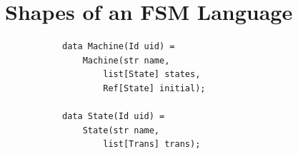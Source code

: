 \section{Shapes of an FSM Language}


\begin{figure}[bt]
	\centering
	\begin{subfigure}[b]{.3\columnwidth}
		\begin{lstlisting}[label=lst:fsm-adt, language=Rascal, numbers=none, xleftmargin=0pt, tabsize=1]
data Machine(Id uid) =
	Machine(str name,
		list[State] states,
		Ref[State] initial);

data State(Id uid) =
	State(str name,
		list[Trans] trans);


\end{lstlisting}
\end{subfigure}
\end{figure}
